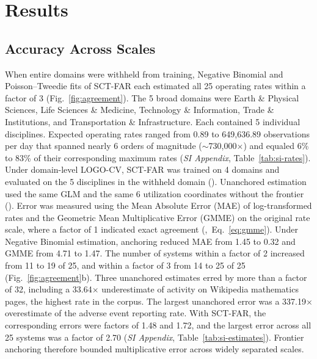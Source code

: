 \documentclass{article}
\begin{document}
\section*{Results}
\label{sec:results}

\subsection*{Accuracy Across Scales}
\label{sub-sec:accuracy}
When entire domains were withheld from training, Negative Binomial and Poisson--Tweedie fits of SCT-FAR each estimated all 25 operating rates within a factor of 3 (Fig.~\ref{fig:agreement}). The 5 broad domains were Earth \& Physical Sciences, Life Sciences \& Medicine, Technology \& Information, Trade \& Institutions, and Transportation \& Infrastructure. Each contained 5 individual disciplines. Expected operating rates ranged from 0.89 to 649,636.89 observations per day that spanned nearly 6 orders of magnitude (${\sim}$730,000$\times$) and equaled 6\% to 83\% of their corresponding maximum rates (\textit{SI Appendix}, Table~\ref{tab:si-rates}). Under domain-level LOGO-CV, SCT-FAR was trained on 4 domains and evaluated on the 5 disciplines in the withheld domain (). Unanchored estimation used the same GLM and the same 6 utilization coordinates without the frontier (). Error was measured using the Mean Absolute Error (MAE) of log-transformed rates and the Geometric Mean Multiplicative Error (GMME) on the original rate scale, where a factor of 1 indicated exact agreement (,~Eq.~\eqref{eq:gmme}). Under Negative Binomial estimation, anchoring reduced MAE from 1.45 to 0.32 and GMME from 4.71 to 1.47. The number of systems within a factor of 2 increased from 11 to 19 of 25, and within a factor of 3 from 14 to 25 of 25 (Fig.~\ref{fig:agreement}b). Three unanchored estimates erred by more than a factor of 32, including a 33.64$\times$ underestimate of activity on Wikipedia mathematics pages, the highest rate in the corpus. The largest unanchored error was a 337.19$\times$ overestimate of the adverse event reporting rate. With SCT-FAR, the corresponding errors were factors of 1.48 and 1.72, and the largest error across all 25 systems was a factor of 2.70 (\textit{SI Appendix}, Table~\ref{tab:si-estimates}). Frontier anchoring therefore bounded multiplicative error across widely separated scales.
\end{document}
